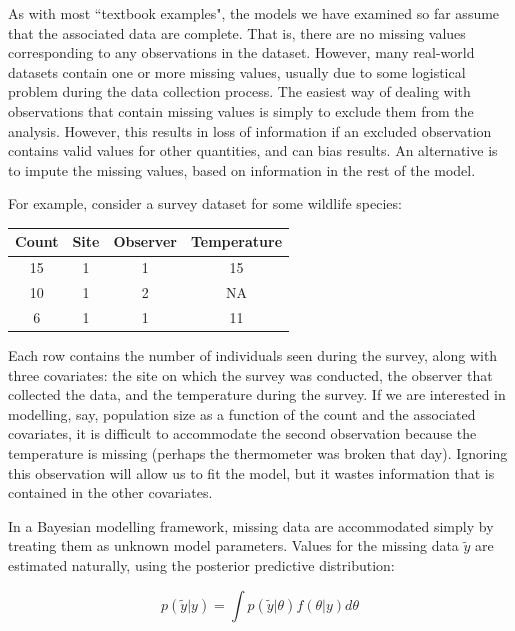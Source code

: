 \documentclass[]{jss}
\begin{document}

As with most ``textbook examples", the models we have examined so far assume that the associated data are complete. That is, there are no missing values corresponding to any observations in the dataset. However, many real-world datasets contain one or more missing values, usually due to some logistical problem during the data collection process. The easiest way of dealing with observations that contain missing values is simply to exclude them from the analysis. However, this results in loss of information if an excluded observation contains valid values for other quantities, and can bias results. An alternative is to impute the missing values, based on information in the rest of the model.

For example, consider a survey dataset for some wildlife species:

\begin{table}
\begin{center}
\begin{tabular}{cccc}
\hline
Count & Site & Observer & Temperature\\
\hline
15 & 1 & 1 & 15\\
10 & 1 & 2 & NA\\
6 & 1 & 1 & 11\\
\hline
\end{tabular}
\end{center}
\end{table}

Each row contains the number of individuals seen during the survey, along with three covariates: the site on which the survey was conducted, the observer that collected the data, and the temperature during the survey. If we are interested in modelling, say, population size as a function of the count and the associated covariates, it is difficult to accommodate the second observation because the temperature is missing (perhaps the thermometer was broken that day). Ignoring this observation will allow us to fit the model, but it wastes information that is contained in the other covariates.

In a Bayesian modelling framework, missing data are accommodated simply by treating them as unknown model parameters. Values for the missing data $\tilde{y}$ are estimated naturally, using the posterior predictive distribution:

\begin{equation}
  p(\tilde{y}|y) = \int p(\tilde{y}|\theta) f(\theta|y) d\theta
\end{equation}
\end{document}
